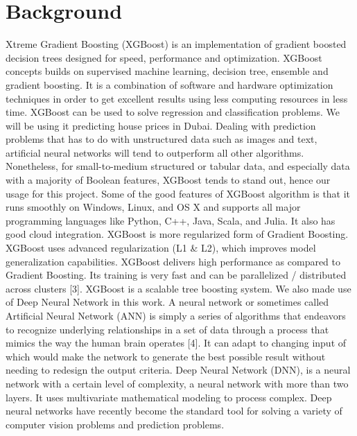 \documentclass[conference]{IEEEtran}
\begin{document}
\section{Background}
Xtreme Gradient Boosting (XGBoost) is an implementation of gradient boosted decision trees designed for speed, performance and optimization. XGBoost concepts builds on supervised machine learning, decision tree, ensemble and gradient boosting. It is a combination of software and hardware optimization techniques in order to get excellent results using less computing resources in less time. XGBoost can be used to solve regression and classification problems. We will be using it predicting house prices in Dubai. Dealing with prediction problems that has to do with unstructured data such as images and text, artificial neural networks will tend to outperform all other algorithms. Nonetheless, for small-to-medium structured or tabular data, and especially data with a majority of Boolean features, XGBoost tends to stand out, hence our usage for this project.
Some of the good features of XGBoost algorithm is that it runs smoothly on Windows, Linux, and OS X and supports all major programming languages like Python, C++, Java, Scala, and Julia. It also has good cloud integration. XGBoost is more regularized form of Gradient Boosting. XGBoost uses advanced regularization (L1 & L2), which improves model generalization capabilities. XGBoost delivers high performance as compared to Gradient Boosting. Its training is very fast and can be parallelized / distributed across clusters [3]. XGBoost is a scalable tree boosting system.
We also made use of Deep Neural Network in this work. A neural network or sometimes called Artificial Neural Network (ANN) is simply a series of algorithms that endeavors to recognize underlying relationships in a set of data through a process that mimics the way the human brain operates [4]. It can adapt to changing input of which would make the network to generate the best possible result without needing to redesign the output criteria.
Deep Neural Network (DNN), is a neural network with a certain level of complexity, a neural network with more than two layers. It uses multivariate mathematical modeling to process complex. Deep neural networks have recently become the standard tool for solving a variety of computer vision problems and prediction problems.
\end{document}
